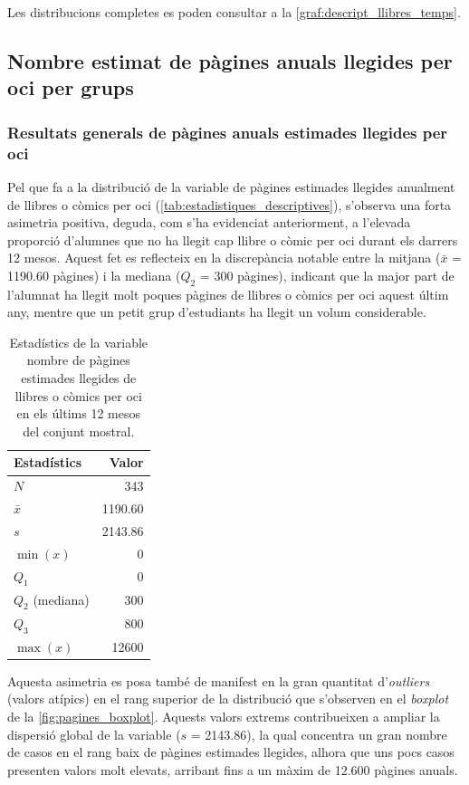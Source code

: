 \documentclass[12pt]{article}
\begin{document}
Les distribucions completes es poden consultar a la \autoref{graf:descript_llibres_temps}.

\subsection{Nombre estimat de pàgines anuals llegides per oci per grups} \label{sec:pagines_grups}
\subsubsection{Resultats generals de pàgines anuals estimades llegides per oci}
Pel que fa a la distribució de la variable de pàgines estimades llegides anualment de llibres o còmics per oci (\autoref{tab:estadistiques_descriptives}), s’observa una forta asimetria positiva, deguda, com s’ha evidenciat anteriorment, a l’elevada proporció d’alumnes que no ha llegit cap llibre o còmic per oci durant els darrers 12 mesos. Aquest fet es reflecteix en la discrepància notable entre la mitjana ($\bar{x}$ = 1190.60 pàgines) i la mediana ($Q_2$ = 300 pàgines), indicant que la major part de l’alumnat ha llegit molt poques pàgines de llibres o còmics per oci aquest últim any, mentre que un petit grup d’estudiants ha llegit un volum considerable.

\begin{table}[H]
\centering
\begin{tabular}{lr}
\hline
\textbf{Estadístics} & \textbf{Valor} \\
\hline
$N$ & 343 \\
$\bar{x}$ & 1190.60 \\
$s$ & 2143.86 \\
$\min(x)$ & 0 \\
$Q_1$ & 0 \\
$Q_2$ (mediana) & 300 \\
$Q_3$ & 800 \\
$\max(x)$ & 12600 \\
\hline
\end{tabular}
\vspace{0.5em}
\caption{Estadístics de la variable nombre de pàgines estimades llegides de llibres o còmics per oci en els últims 12 mesos del conjunt mostral.}
\label{tab:estadistiques_descriptives}
\end{table}

Aquesta asimetria es posa també de manifest en la gran quantitat d'\emph{outliers} (valors atípics) en el rang superior de la distribució que s'observen en el \emph{boxplot} de la \autoref{fig:pagines_boxplot}. Aquests valors extrems contribueixen a ampliar la dispersió global de la variable ($s$ = 2143.86), la qual concentra un gran nombre de casos en el rang baix de pàgines estimades llegides, alhora que uns pocs casos presenten valors molt elevats, arribant fins a un màxim de 12.600 pàgines anuals.
\end{document}

